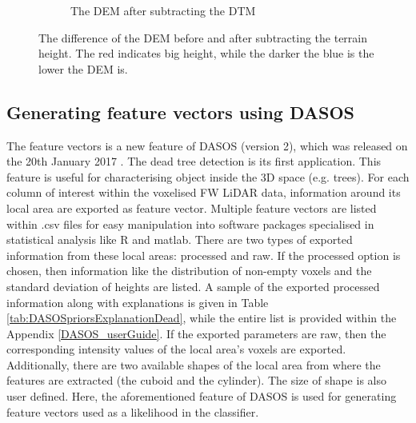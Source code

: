 \documentclass{subfiles}
\begin{document}
\begin{figure} [h!]
\begin{subfigure}[t]{.49\textwidth}
		\caption{The DEM after subtracting the DTM} 
		\label{fig:height_dtm}
	\end{subfigure} \hfill
	\caption[Before and after subtracting the DTM.]{The difference of the DEM before and after subtracting the terrain height. The  red indicates big height, while the darker the blue is the lower the DEM is.}  
	\label{fig:height_minus_dtm} 
\end{figure}


\subsection{Generating feature vectors using DASOS}\label{sec:3DpriorsGeneration}

\par The feature vectors is a new feature of DASOS (version 2), which was released on the 20th January 2017 \cite{DASOS_v2}. The dead tree detection is its first application. This feature is useful for characterising object inside the 3D space (e.g. trees). For each column of interest within the voxelised FW LiDAR data, information around its local area are exported as feature vector. Multiple feature vectors are listed within .csv files for easy manipulation into software packages specialised in statistical analysis like R and matlab. There are two types of exported information from these local areas: processed and raw. If the processed option is chosen, then information like the distribution of non-empty voxels and the standard deviation of heights are listed. A sample of the exported processed information along with explanations is given in Table \ref{tab:DASOSpriorsExplanationDead}, while the entire list is provided within the Appendix \ref{DASOS_userGuide}. If the exported parameters are raw, then the corresponding intensity values of the local area's voxels are exported. {\color{blue} Additionally, there are two available shapes of the local area from where the features are extracted (the cuboid and the cylinder). The size of shape is also user defined. Here, the aforementioned feature of DASOS is used for generating feature vectors used as a likelihood in the classifier. }
\end{document}
